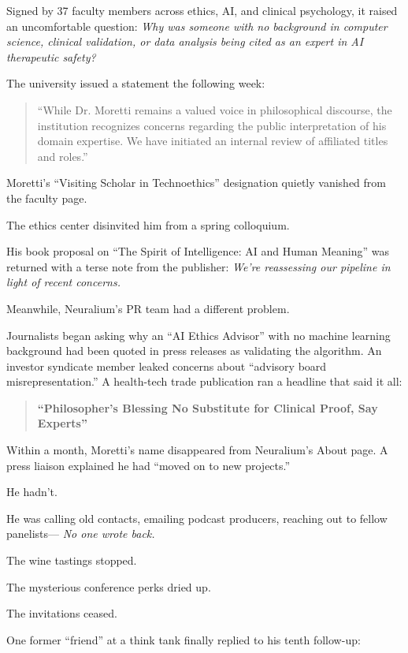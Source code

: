 Signed by 37 faculty members across ethics, AI, and clinical psychology, it raised an uncomfortable question:
\textit{Why was someone with no background in computer science, clinical validation, or data analysis being cited as an expert in AI therapeutic safety?}

The university issued a statement the following week:

\begin{quote}
“While Dr. Moretti remains a valued voice in philosophical discourse, the institution recognizes concerns regarding the public interpretation of his domain expertise. We have initiated an internal review of affiliated titles and roles.”
\end{quote}

Moretti’s “Visiting Scholar in Technoethics” designation quietly vanished from the faculty page.

The ethics center disinvited him from a spring colloquium.

His book proposal on “The Spirit of Intelligence: AI and Human Meaning” was returned with a terse note from the publisher:
\textit{We’re reassessing our pipeline in light of recent concerns.}

\medskip

Meanwhile, Neuralium’s PR team had a different problem.

Journalists began asking why an “AI Ethics Advisor” with no machine learning background had been quoted in press releases as validating the algorithm.
An investor syndicate member leaked concerns about “advisory board misrepresentation.”
A health-tech trade publication ran a headline that said it all:

\begin{quote}
\textbf{“Philosopher’s Blessing No Substitute for Clinical Proof, Say Experts”}
\end{quote}

Within a month, Moretti’s name disappeared from Neuralium’s About page.
A press liaison explained he had “moved on to new projects.”

He hadn’t.

He was calling old contacts, emailing podcast producers, reaching out to fellow panelists—
\textit{No one wrote back.}

The wine tastings stopped.

The mysterious conference perks dried up.

The invitations ceased.

One former “friend” at a think tank finally replied to his tenth follow-up:


